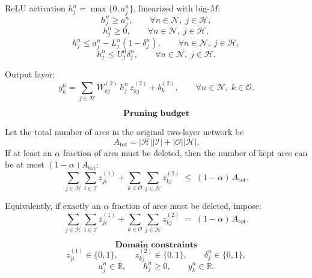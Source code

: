\documentclass[12pt, a4paper]{article}
\begin{document}
ReLU activation \(h^n_j=\max\{0,a^n_j\}\), linearized with big-\(M\):
\[
h^n_j \ge a^n_j,
\qquad \forall n\in\mathcal{N},\; j\in\mathcal{H},
\]
\[
h^n_j \ge 0,
\qquad \forall n\in\mathcal{N},\; j\in\mathcal{H},
\]
\[
h^n_j \le a^n_j - L^n_j(1-\delta^n_j),
\qquad \forall n\in\mathcal{N},\; j\in\mathcal{H},
\]
\[
h^n_j \le U^n_j \delta^n_j,
\qquad \forall n\in\mathcal{N},\; j\in\mathcal{H}.
\]

Output layer:
\[
y^n_k = \sum_{j\in\mathcal{H}} W^{(2)}_{kj}\, h^n_j \, z^{(2)}_{kj} + b^{(2)}_k,
\qquad \forall n\in\mathcal{N},\; k\in\mathcal{O}.
\]

\[
\textbf{Pruning budget}
\]

Let the total number of arcs in the original two-layer network be
\[
A_{\text{tot}} = |\mathcal{H}||\mathcal{I}| + |\mathcal{O}||\mathcal{H}|.
\]
If at least an \(\alpha\) fraction of arcs must be deleted, then the number of kept arcs can be at most \((1-\alpha)A_{\text{tot}}\):
\[
\sum_{j\in\mathcal{H}}\sum_{i\in\mathcal{I}} z^{(1)}_{ji}
+
\sum_{k\in\mathcal{O}}\sum_{j\in\mathcal{H}} z^{(2)}_{kj}
\;\le\;
(1-\alpha)\, A_{\text{tot}}.
\]

Equivalently, if exactly an \(\alpha\) fraction of arcs must be deleted, impose:
\[
\sum_{j\in\mathcal{H}}\sum_{i\in\mathcal{I}} z^{(1)}_{ji}
+
\sum_{k\in\mathcal{O}}\sum_{j\in\mathcal{H}} z^{(2)}_{kj}
\;=\;
(1-\alpha)\, A_{\text{tot}}.
\]

\[
\textbf{Domain constraints}
\]
\[
z^{(1)}_{ji}\in\{0,1\},\qquad
z^{(2)}_{kj}\in\{0,1\},\qquad
\delta^n_j\in\{0,1\},
\]
\[
a^n_j\in\mathbb{R},\qquad
h^n_j\ge 0,\qquad
y^n_k\in\mathbb{R}.
\]
\end{document}
